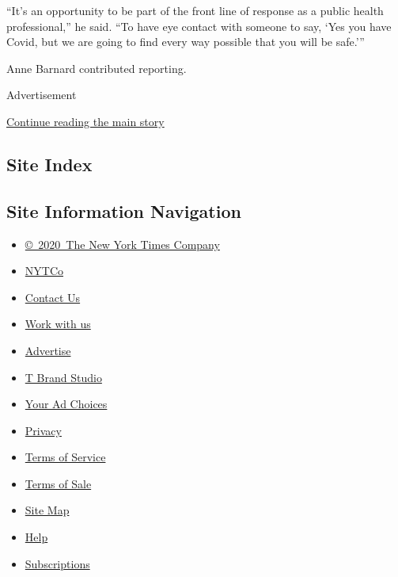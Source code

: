 ``It's an opportunity to be part of the front line of response as a
public health professional,'' he said. ``To have eye contact with
someone to say, `Yes you have Covid, but we are going to find every way
possible that you will be safe.'''

Anne Barnard contributed reporting.

Advertisement

\protect\hyperlink{after-bottom}{Continue reading the main story}

\hypertarget{site-index}{%
\subsection{Site Index}\label{site-index}}

\hypertarget{site-information-navigation}{%
\subsection{Site Information
Navigation}\label{site-information-navigation}}

\begin{itemize}
\tightlist
\item
  \href{https://help.nytimes3xbfgragh.onion/hc/en-us/articles/115014792127-Copyright-notice}{©~2020~The
  New York Times Company}
\end{itemize}

\begin{itemize}
\tightlist
\item
  \href{https://www.nytco.com/}{NYTCo}
\item
  \href{https://help.nytimes3xbfgragh.onion/hc/en-us/articles/115015385887-Contact-Us}{Contact
  Us}
\item
  \href{https://www.nytco.com/careers/}{Work with us}
\item
  \href{https://nytmediakit.com/}{Advertise}
\item
  \href{http://www.tbrandstudio.com/}{T Brand Studio}
\item
  \href{https://www.nytimes3xbfgragh.onion/privacy/cookie-policy\#how-do-i-manage-trackers}{Your
  Ad Choices}
\item
  \href{https://www.nytimes3xbfgragh.onion/privacy}{Privacy}
\item
  \href{https://help.nytimes3xbfgragh.onion/hc/en-us/articles/115014893428-Terms-of-service}{Terms
  of Service}
\item
  \href{https://help.nytimes3xbfgragh.onion/hc/en-us/articles/115014893968-Terms-of-sale}{Terms
  of Sale}
\item
  \href{https://spiderbites.nytimes3xbfgragh.onion}{Site Map}
\item
  \href{https://help.nytimes3xbfgragh.onion/hc/en-us}{Help}
\item
  \href{https://www.nytimes3xbfgragh.onion/subscription?campaignId=37WXW}{Subscriptions}
\end{itemize}
